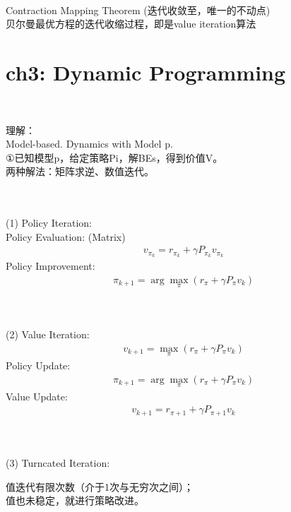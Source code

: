 \documentclass{article}
\begin{document}
~ \\[3pt]
\begin{CJK}{UTF8}{gbsn}
    Contraction Mapping Theorem (迭代收敛至，唯一的不动点) \\[3pt]
    贝尔曼最优方程的迭代收缩过程，即是value iteration算法 \\[3pt]
\end{CJK}


\newpage
\section*{ch3: Dynamic Programming}

~ \\[3pt]
\begin{CJK}{UTF8}{gbsn}
    理解： \\[3pt]
    Model-based. Dynamics with Model p. \\[3pt]
    ①已知模型p，给定策略Pi，解BEs，得到价值V。 \\[3pt]
    两种解法：矩阵求逆、数值迭代。 \\[3pt]
\end{CJK}


~ \\[3pt]
~ \\[3pt]
(1) Policy Iteration: 
~ \\[3pt]
Policy Evaluation: (Matrix) 
\begin{align*}
    v_{\pi_{k}} = r_{\pi_{k}} + \gamma P_{\pi_{k}} v_{\pi_{k}} 
\end{align*}
Policy Improvement: 
\begin{align*}
    \pi_{k+1} = \arg \max_{\pi} 
    ( r_{\pi} + \gamma P_{\pi} v_{k} ) 
\end{align*}


~ \\[3pt]
~ \\[3pt]
(2) Value Iteration: 
\begin{align*}
    v_{k+1} = \max_{\pi} ( r_{\pi} + \gamma P_{\pi} v_{k} ) 
\end{align*}
Policy Update: 
\begin{align*}
    \pi_{k+1} = \arg \max_{\pi} 
    ( r_{\pi} + \gamma P_{\pi} v_{k} ) 
\end{align*}
Value Update: 
\begin{align*}
    v_{k+1} = r_{\pi+1} + \gamma P_{\pi+1} v_{k} 
\end{align*}


~ \\[3pt]
~ \\[3pt]
(3) Turncated Iteration: \\[3pt]
\begin{CJK}{UTF8}{gbsn}
    值迭代有限次数（介于1次与无穷次之间）； \\[3pt]
    值也未稳定，就进行策略改进。 \\[3pt]
\end{CJK}
\end{document}
